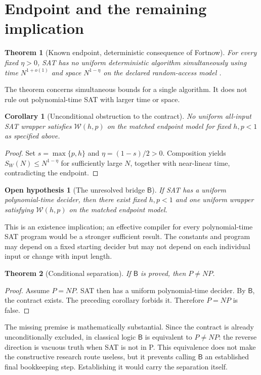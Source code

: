 \documentclass[11pt]{article}
\newtheorem{theorem}{Theorem}
\newtheorem{corollary}{Corollary}
\newtheorem{hypothesis}{Open hypothesis}
\begin{document}
\section{Endpoint and the remaining implication}
\begin{theorem}[Known endpoint, deterministic consequence of Fortnow]
For every fixed $\eta>0$, SAT has no uniform deterministic algorithm
simultaneously using time $N^{1+o(1)}$ and space $N^{1-\eta}$ on the
declared random-access model \cite{fortnow}.
\end{theorem}
The theorem concerns simultaneous bounds for a single algorithm. It
does not rule out polynomial-time SAT with larger time or space.

\begin{corollary}[Unconditional obstruction to the contract]
No uniform all-input SAT wrapper satisfies $\mathcal W(h,p)$ on the
matched endpoint model for fixed $h,p<1$ as specified above.
\end{corollary}
\begin{proof}
Set $s=\max\{p,h\}$ and $\eta=(1-s)/2>0$. Composition yields
$S_W(N)\le N^{1-\eta}$ for sufficiently large $N$, together with near-linear
time, contradicting the endpoint.
\end{proof}

\begin{hypothesis}[The unresolved bridge $\mathsf B$]
If SAT has a uniform polynomial-time decider, then there exist fixed
$h,p<1$ and one uniform wrapper satisfying $\mathcal W(h,p)$ on the
matched endpoint model.
\end{hypothesis}
This is an existence implication; an effective compiler for every
polynomial-time SAT program would be a stronger sufficient result.
The constants and program may depend on a fixed starting decider but may
not depend on each individual input or change with input length.

\begin{theorem}[Conditional separation]
If $\mathsf B$ is proved, then $P\ne NP$.
\end{theorem}
\begin{proof}
Assume $P=NP$. SAT then has a uniform polynomial-time decider.
By $\mathsf B$, the contract exists. The preceding corollary forbids it.
Therefore $P=NP$ is false.
\end{proof}

The missing premise is mathematically substantial. Since the contract is
already unconditionally excluded, in classical logic $\mathsf B$ is
equivalent to $P\ne NP$: the reverse direction is vacuous truth when
SAT is not in P. This equivalence does not make the constructive research
route useless, but it prevents calling $\mathsf B$ an established final
bookkeeping step. Establishing it would carry the separation itself.
\end{document}
